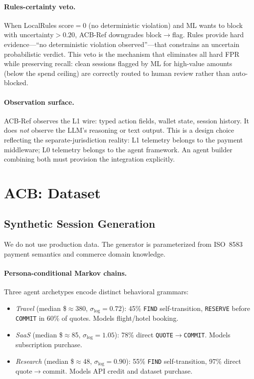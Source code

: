 \documentclass{article}
\begin{document}
\paragraph{Rules-certainty veto.}
When LocalRules score$=0$ (no deterministic violation) and ML wants to block
with uncertainty$>0.20$, ACB-Ref downgrades block$\to$flag. Rules provide hard
evidence---``no deterministic violation observed''---that constrains an
uncertain probabilistic verdict. This veto is the mechanism that eliminates all
hard FPR while preserving recall: clean sessions flagged by ML for high-value
amounts (below the spend ceiling) are correctly routed to human review rather
than auto-blocked.

\paragraph{Observation surface.}
ACB-Ref observes the L1 wire: typed action fields, wallet state, session history.
It does \emph{not} observe the LLM's reasoning or text output. This is a design
choice reflecting the separate-jurisdiction reality: L1 telemetry belongs to the
payment middleware; L0 telemetry belongs to the agent framework. An agent builder
combining both must provision the integration explicitly.

\section{ACB: Dataset}
\label{sec:dataset}

\subsection{Synthetic Session Generation}
\label{sec:gen}

We do not use production data. The generator is parameterized from ISO~8583
payment semantics and commerce domain knowledge.

\paragraph{Persona-conditional Markov chains.}
Three agent archetypes encode distinct behavioral grammars:
\begin{itemize}
\item \emph{Travel} (median \$$\approx$380, $\sigma_{\log}{=}0.72$): 45\%
  \texttt{FIND} self-transition, \texttt{RESERVE} before \texttt{COMMIT} in
  60\% of quotes. Models flight/hotel booking.
\item \emph{SaaS} (median \$$\approx$85, $\sigma_{\log}{=}1.05$): 78\%
  direct \texttt{QUOTE}$\to$\texttt{COMMIT}. Models subscription purchase.
\item \emph{Research} (median \$$\approx$48, $\sigma_{\log}{=}0.90$): 55\%
  \texttt{FIND} self-transition, 97\% direct quote$\to$commit. Models API
  credit and dataset purchase.
\end{itemize}
\end{document}
